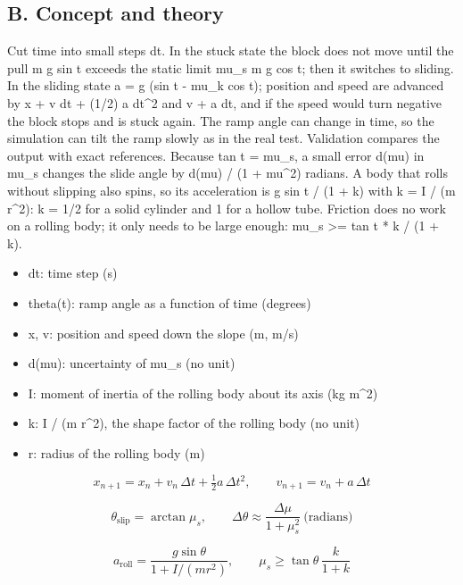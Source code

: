 \documentclass[11pt,a4paper]{article}
\begin{document}
\subsection*{B. Concept and theory}
Cut time into small steps dt. In the stuck state the block does not move until the pull m g sin t exceeds the static limit mu\_s m g cos t; then it switches to sliding. In the sliding state a = g (sin t - mu\_k cos t); position and speed are advanced by x + v dt + (1/2) a dt\textasciicircum{}2 and v + a dt, and if the speed would turn negative the block stops and is stuck again. The ramp angle can change in time, so the simulation can tilt the ramp slowly as in the real test. Validation compares the output with exact references. Because tan t = mu\_s, a small error d(mu) in mu\_s changes the slide angle by d(mu) / (1 + mu\textasciicircum{}2) radians. A body that rolls without slipping also spins, so its acceleration is g sin t / (1 + k) with k = I / (m r\textasciicircum{}2): k = 1/2 for a solid cylinder and 1 for a hollow tube. Friction does no work on a rolling body; it only needs to be large enough: mu\_s \textgreater{}= tan t * k / (1 + k).

\begin{itemize}[nosep]
\item dt: time step (s)
\item theta(t): ramp angle as a function of time (degrees)
\item x, v: position and speed down the slope (m, m/s)
\item d(mu): uncertainty of mu\_s (no unit)
\item I: moment of inertia of the rolling body about its axis (kg m\textasciicircum{}2)
\item k: I / (m r\textasciicircum{}2), the shape factor of the rolling body (no unit)
\item r: radius of the rolling body (m)
\end{itemize}

\begin{equation*}
x_{n+1}=x_n+v_n\,\Delta t+\tfrac12 a\,\Delta t^2,\qquad v_{n+1}=v_n+a\,\Delta t
\end{equation*}

\begin{equation*}
\theta_{\text{slip}}=\arctan\mu_s,\qquad \Delta\theta\approx\frac{\Delta\mu}{1+\mu_s^2}\ \text{(radians)}
\end{equation*}

\begin{equation*}
a_{\text{roll}}=\frac{g\sin\theta}{1+I/(mr^2)},\qquad \mu_s\ge\tan\theta\,\frac{k}{1+k}
\end{equation*}
\end{document}
